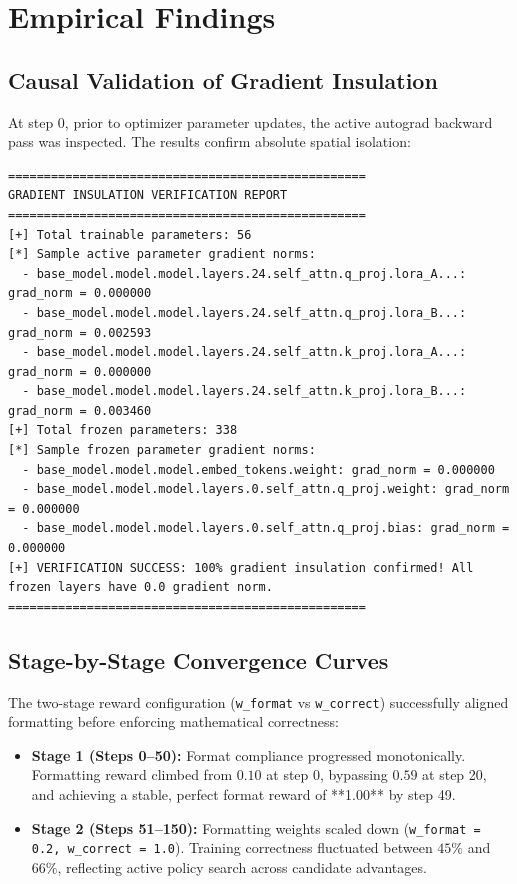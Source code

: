 \documentclass[11pt]{article}
\begin{document}
\section{Empirical Findings}

\subsection{Causal Validation of Gradient Insulation}

At step 0, prior to optimizer parameter updates, the active autograd backward pass was inspected. The results confirm absolute spatial isolation:

\begin{lstlisting}[caption={Gradient Insulation Verification Output at Step 0}]
==================================================
GRADIENT INSULATION VERIFICATION REPORT
==================================================
[+] Total trainable parameters: 56
[*] Sample active parameter gradient norms:
  - base_model.model.model.layers.24.self_attn.q_proj.lora_A...: grad_norm = 0.000000
  - base_model.model.model.layers.24.self_attn.q_proj.lora_B...: grad_norm = 0.002593
  - base_model.model.model.layers.24.self_attn.k_proj.lora_A...: grad_norm = 0.000000
  - base_model.model.model.layers.24.self_attn.k_proj.lora_B...: grad_norm = 0.003460
[+] Total frozen parameters: 338
[*] Sample frozen parameter gradient norms:
  - base_model.model.model.embed_tokens.weight: grad_norm = 0.000000
  - base_model.model.model.layers.0.self_attn.q_proj.weight: grad_norm = 0.000000
  - base_model.model.model.layers.0.self_attn.q_proj.bias: grad_norm = 0.000000
[+] VERIFICATION SUCCESS: 100% gradient insulation confirmed! All frozen layers have 0.0 gradient norm.
==================================================
\end{lstlisting}

\subsection{Stage-by-Stage Convergence Curves}

The two-stage reward configuration (\texttt{w\_format} vs \texttt{w\_correct}) successfully aligned formatting before enforcing mathematical correctness:
\begin{itemize}
    \item \textbf{Stage 1 (Steps 0--50):} Format compliance progressed monotonically. Formatting reward climbed from $0.10$ at step 0, bypassing $0.59$ at step 20, and achieving a stable, perfect format reward of **1.00** by step 49.
    \item \textbf{Stage 2 (Steps 51--150):} Formatting weights scaled down (\texttt{w\_format = 0.2, w\_correct = 1.0}). Training correctness fluctuated between $45\%$ and $66\%$, reflecting active policy search across candidate advantages.
\end{itemize}
\end{document}
